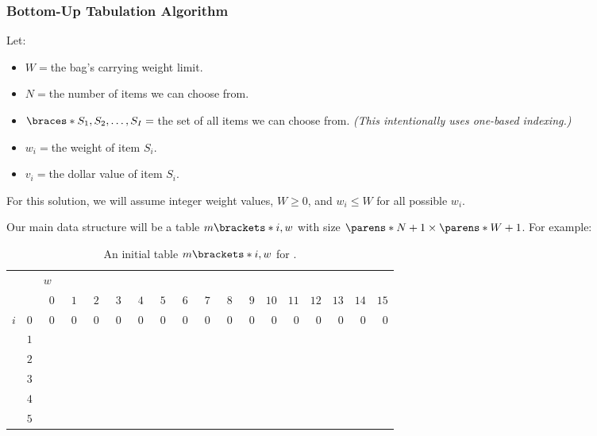\subsubsection{Bottom-Up Tabulation Algorithm}

Let:
\begin{itemize}
    \item $W = {}$the bag's carrying weight limit.
    \item $N = {}$the number of items we can choose from.
    \item $\braces*{S_1, S_2, \dots, S_I} = {}$the set of all items we can choose from. \emph{(This intentionally uses one-based indexing.)}
    \item $w_i = {}$the weight of item $S_i$.
    \item $v_i = {}$the dollar value of item $S_i$.
\end{itemize}

For this solution, we will assume integer weight values, $W \ge 0$, and $w_i \le W$ for all possible $w_i$.

Our main data structure will be a table $m \brackets*{i, w}$ with size $\parens*{N + 1} \times \parens*{W + 1}$. For example:

\begin{table}[H]
    \centering
    \caption{An initial table $m \brackets*{i, w}$ for .}
    \label{tab:0-1-knapsack-problem--ds}
    \begin{tabular}{cr|rrrrrrrrrrrrrrrr|}
        {}
            &
            & \multicolumn{16}{l|}{$w$} \\
        {}
            &
            & $\phantom{0}0$ & $\phantom{0}1$ & $\phantom{0}2$ & $\phantom{0}3$
            & $\phantom{0}4$ & $\phantom{0}5$ & $\phantom{0}6$ & $\phantom{0}7$
            & $\phantom{0}8$ & $\phantom{0}9$
            & $10$ & $11$ & $12$ &$13$ & $14$ & $15$ \\ \hline
        $i$
            & $0$
            & $0$ & $0$ & $0$ & $0$ & $0$ & $0$ & $0$ & $0$
            & $0$ & $0$ & $0$ & $0$ & $0$ & $0$ & $0$ & $0$ \\
        {}
            & $1$
            & & & & & & & & & & & & & & & & \\
        {}
            & $2$
            & & & & & & & & & & & & & & & & \\
        {}
            & $3$
            & & & & & & & & & & & & & & & & \\
        {}
            & $4$
            & & & & & & & & & & & & & & & & \\
        {}
            & $5$
            & & & & & & & & & & & & & & & & \\ \hline
    \end{tabular}
\end{table}

